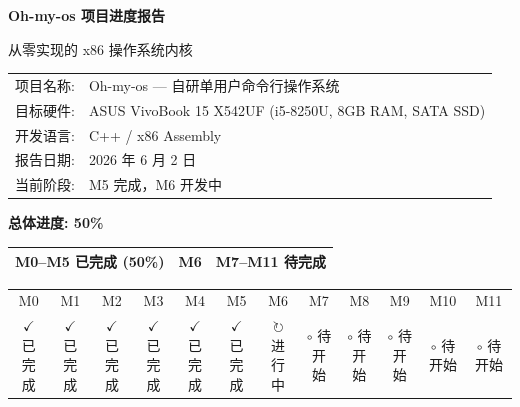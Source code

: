 \documentclass[12pt,a4paper]{article}
\newcommand{\statusdone}{\textcolor{done}{$\checkmark$ 已完成}}
\newcommand{\statuswip}{\textcolor{inprogress}{$\circlearrowright$ 进行中}}
\newcommand{\statuspending}{\textcolor{pending}{$\circ$ 待开始}}
\begin{document}
\begin{titlepage}
\centering

\vspace*{3cm}

{\Huge\bfseries Oh-my-os 项目进度报告\par}

\vspace{1cm}

{\Large 从零实现的 x86 操作系统内核\par}

\vspace{1.5cm}

{\large
\begin{tabular}{rl}
    项目名称: & Oh-my-os --- 自研单用户命令行操作系统 \\
    目标硬件: & ASUS VivoBook 15 X542UF (i5-8250U, 8GB RAM, SATA SSD) \\
    开发语言: & C++ / x86 Assembly \\
    报告日期: & 2026 年 6 月 2 日 \\
    当前阶段: & M5 完成，M6 开发中 \\
\end{tabular}
\par}

\vspace{2cm}

{\large
\textbf{总体进度: 50\%}

\vspace{0.2cm}
{\renewcommand{\arraystretch}{0.8}
\begin{tabular}{|p{0.75cm}|p{0.75cm}|p{0.75cm}|p{0.75cm}|p{0.75cm}|p{0.75cm}|p{0.75cm}|p{0.75cm}|p{0.75cm}|p{0.75cm}|p{0.75cm}|p{0.75cm}|}
\hline
\multicolumn{6}{|c|}{\cellcolor{done!30}M0--M5 已完成 (50\%)} &
\multicolumn{1}{c|}{\cellcolor{inprogress!20}M6} &
\multicolumn{5}{c|}{M7--M11 待完成} \\
\hline
\end{tabular}}
\vspace{0.2cm}

\begin{tabular}{cccccccccccc}
\tiny M0 & \tiny M1 & \tiny M2 & \tiny M3 & \tiny M4 & \tiny M5 & \tiny M6 & \tiny M7 & \tiny M8 & \tiny M9 & \tiny M10 & \tiny M11 \\
\statusdone & \statusdone & \statusdone & \statusdone & \statusdone & \statusdone & \statuswip & \statuspending & \statuspending & \statuspending & \statuspending & \statuspending \\
\end{tabular}
\par}


\end{titlepage}
\end{document}
